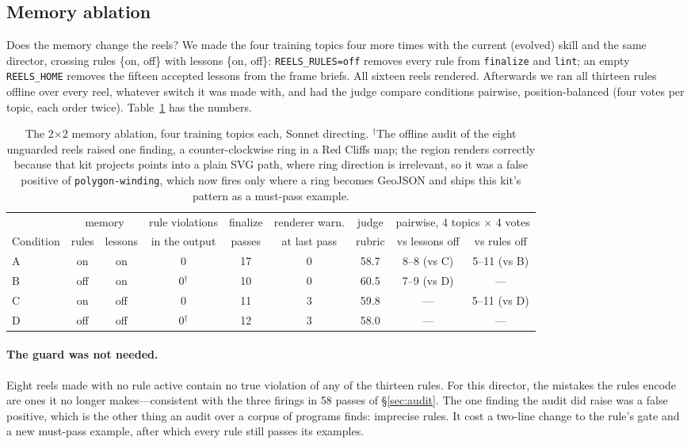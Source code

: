 \documentclass[11pt]{article}
\begin{document}
\subsection{Memory ablation}
\label{sec:ablation}
Does the memory change the reels? We made the four training topics four more times with the
current (evolved) skill and the same director, crossing rules \{on, off\} with lessons \{on, off\}:
\texttt{REELS\_RULES=off} removes every rule from \texttt{finalize} and \texttt{lint}; an empty
\texttt{REELS\_HOME} removes the fifteen accepted lessons from the frame briefs. All sixteen reels
rendered. Afterwards we ran all thirteen rules offline over every reel, whatever switch it was made
with, and had the judge compare conditions pairwise, position-balanced (four votes per topic, each
order twice). Table~\ref{tab:ablation} has the numbers.

\begin{table}[t]
\centering\small
\begin{tabular}{lcc|cccc|cc}
\toprule
 & \multicolumn{2}{c|}{memory} & rule violations & finalize & renderer warn. & judge & \multicolumn{2}{c}{pairwise, 4 topics $\times$ 4 votes} \\
Condition & rules & lessons & in the output & passes & at last pass & rubric & vs lessons off & vs rules off \\
\midrule
A & on & on & 0 & 17 & 0 & 58.7 & 8--8 (vs C) & 5--11 (vs B) \\
B & off & on & 0$^\dagger$ & 10 & 0 & 60.5 & 7--9 (vs D) & --- \\
C & on & off & 0 & 11 & 3 & 59.8 & --- & 5--11 (vs D) \\
D & off & off & 0$^\dagger$ & 12 & 3 & 58.0 & --- & --- \\
\bottomrule
\end{tabular}
\caption{The 2$\times$2 memory ablation, four training topics each, Sonnet directing. $^\dagger$The
offline audit of the eight unguarded reels raised one finding, a counter-clockwise ring in a Red Cliffs
map; the region renders correctly because that kit projects points into a plain SVG path, where ring
direction is irrelevant, so it was a false positive of \texttt{polygon-winding}, which now fires only
where a ring becomes GeoJSON and ships this kit's pattern as a must-pass example.}
\label{tab:ablation}
\end{table}

\paragraph{The guard was not needed.} Eight reels made with no rule active contain no true violation
of any of the thirteen rules. For this director, the mistakes the rules encode are ones it no longer
makes---consistent with the three firings in 58 passes of \S\ref{sec:audit}. The one finding the audit
did raise was a false positive, which is the other thing an audit over a corpus of programs finds:
imprecise rules. It cost a two-line change to the rule's gate and a new must-pass example, after which
every rule still passes its examples.
\end{document}
